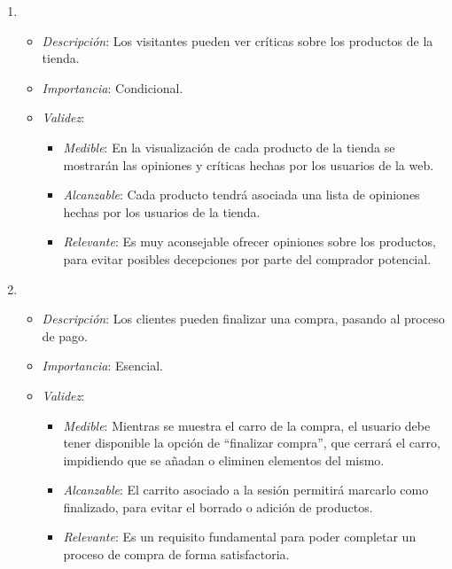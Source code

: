 \begin{enumerate}[{\bf RF-1}]
\item 
  \begin{itemize}
  \item \textit{Descripción}: Los visitantes pueden ver críticas sobre los productos de la tienda.
  \item \textit{Importancia}: Condicional.
  \item \textit{Validez}:
    \begin{itemize}
    \item \textit{Medible}: En la visualización de cada producto de la tienda se mostrarán las opiniones y críticas hechas por los usuarios de la web.
    \item \textit{Alcanzable}: Cada producto tendrá asociada una lista de opiniones hechas por los usuarios de la tienda.
    \item \textit{Relevante}: Es muy aconsejable ofrecer opiniones sobre los productos, para evitar posibles decepciones por parte del comprador potencial.
    \end{itemize}
  \end{itemize}

\item 
  \begin{itemize}
  \item \textit{Descripción}: Los clientes pueden finalizar una compra, pasando al proceso de pago.
  \item \textit{Importancia}: Esencial.
  \item \textit{Validez}:
    \begin{itemize}
    \item \textit{Medible}: Mientras se muestra el carro de la compra, el usuario debe tener disponible la opción de ``finalizar compra'', que cerrará el carro, impidiendo que se añadan o eliminen elementos del mismo.
    \item \textit{Alcanzable}: El carrito asociado a la sesión permitirá marcarlo como finalizado, para evitar el borrado o adición de productos.
    \item \textit{Relevante}: Es un requisito fundamental para poder completar un proceso de compra de forma satisfactoria.
    \end{itemize}
  \end{itemize}


\end{enumerate}
